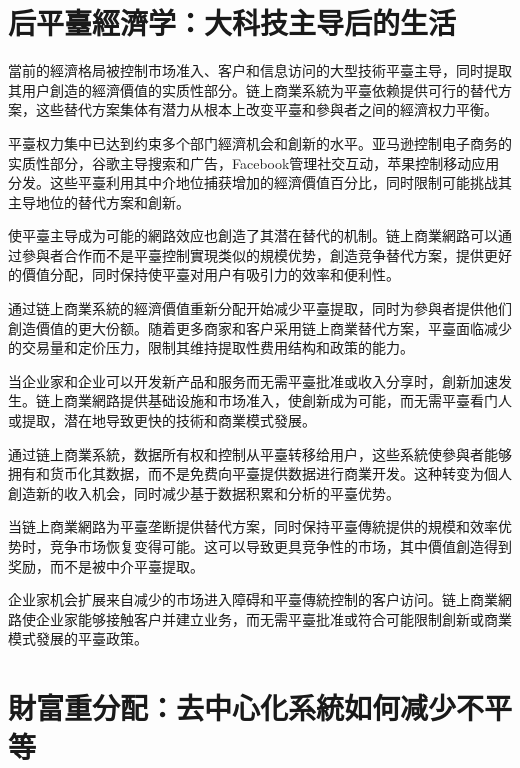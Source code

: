 \documentclass[
  Letterpaper,
]{scrbook}
\begin{document}
\section{后平臺經濟学：大科技主导后的生活}\label{ux540eux5e73ux81faux7d93ux6fdfux5b66ux5927ux79d1ux6280ux4e3bux5bfcux540eux7684ux751fux6d3b}

當前的經濟格局被控制市场准入、客户和信息访问的大型技術平臺主导，同时提取其用户創造的經濟價值的实质性部分。链上商業系統为平臺依赖提供可行的替代方案，这些替代方案集体有潜力从根本上改变平臺和參與者之间的經濟权力平衡。

平臺权力集中已达到约束多个部门經濟机会和創新的水平。亚马逊控制电子商务的实质性部分，谷歌主导搜索和广告，Facebook管理社交互动，苹果控制移动应用分发。这些平臺利用其中介地位捕获增加的經濟價值百分比，同时限制可能挑战其主导地位的替代方案和創新。

使平臺主导成为可能的網路效应也創造了其潜在替代的机制。链上商業網路可以通过參與者合作而不是平臺控制實現类似的規模优势，創造竞争替代方案，提供更好的價值分配，同时保持使平臺对用户有吸引力的效率和便利性。

通过链上商業系統的經濟價值重新分配开始减少平臺提取，同时为參與者提供他们創造價值的更大份额。随着更多商家和客户采用链上商業替代方案，平臺面临减少的交易量和定价压力，限制其维持提取性费用结构和政策的能力。

当企业家和企业可以开发新产品和服务而无需平臺批准或收入分享时，創新加速发生。链上商業網路提供基础设施和市场准入，使創新成为可能，而无需平臺看门人或提取，潜在地导致更快的技術和商業模式發展。

通过链上商業系統，数据所有权和控制从平臺转移给用户，这些系統使參與者能够拥有和货币化其数据，而不是免费向平臺提供数据进行商業开发。这种转变为個人創造新的收入机会，同时减少基于数据积累和分析的平臺优势。

当链上商業網路为平臺垄断提供替代方案，同时保持平臺傳統提供的規模和效率优势时，竞争市场恢复变得可能。这可以导致更具竞争性的市场，其中價值創造得到奖励，而不是被中介平臺提取。

企业家机会扩展来自减少的市场进入障碍和平臺傳統控制的客户访问。链上商業網路使企业家能够接触客户并建立业务，而无需平臺批准或符合可能限制創新或商業模式發展的平臺政策。

\section{財富重分配：去中心化系統如何减少不平等}\label{ux8ca1ux5bccux91cdux5206ux914dux53bbux4e2dux5fc3ux5316ux7cfbux7d71ux5982ux4f55ux51cfux5c11ux4e0dux5e73ux7b49}
\end{document}
